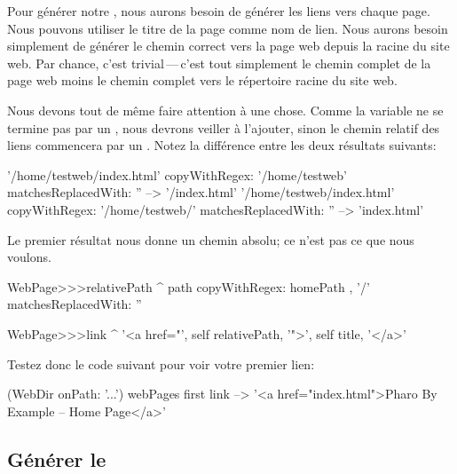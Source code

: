 \documentclass[a4paper,10pt,twoside]{book}
\begin{document}
Pour générer notre \sitemap, nous aurons besoin de générer les liens
vers chaque page.
Nous pouvons utiliser le titre de la page comme nom de lien. Nous
aurons besoin simplement de générer le chemin correct vers la page web
depuis la racine du site web.
Par chance, c'est trivial\,---\,c'est tout simplement le chemin
complet de la page web moins le chemin complet vers le répertoire
racine du site web.

Nous devons tout de même faire attention à une chose. Comme la
variable  ne se termine pas par un \ct{/}, nous devrons
veiller à l'ajouter, sinon le chemin relatif des liens commencera par
un \ct{/}.
Notez la différence entre les deux résultats suivants:

\begin{code}{}
'/home/testweb/index.html' copyWithRegex: '/home/testweb' matchesReplacedWith: '' --> '/index.html'
'/home/testweb/index.html' copyWithRegex: '/home/testweb/' matchesReplacedWith: '' -->  'index.html'
\end{code}

Le premier résultat nous donne un chemin absolu; ce n'est pas ce que
nous voulons.


\begin{code}{}
WebPage>>>relativePath
	^ path 
		copyWithRegex: homePath , '/'
		matchesReplacedWith: ''

WebPage>>>link
	^ '<a href="', self relativePath, '">', self title, '</a>'
\end{code}

Testez donc le code suivant pour voir votre premier lien:

\begin{code}{}
(WebDir onPath: '...') webPages first link --> '<a href="index.html">Pharo By Example -- Home Page</a>'
\end{code}

\subsection{Générer le \sitemap}
\end{document}

